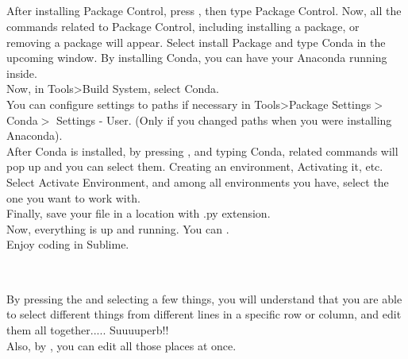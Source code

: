 \documentclass[a4paper,18pt]{article}
\begin{document}

\subsection{\colorbox {matgreen}{\color{white}{\large Conda}}}
After installing Package Control, press {\textbf{\color{Red}{Ctrl+Shift+P}}}, then type Package Control. Now, all the commands related to Package Control, including installing a package, or removing a package will appear. Select install Package and type Conda in the upcoming window. By installing Conda, you can have your Anaconda running inside.\\
Now, in Tools>Build System, select Conda.\\
You can configure settings to paths if necessary in Tools>Package Settings$>$ Conda$>$ Settings - User. (Only if you changed paths when you were installing Anaconda).\\

After Conda is installed, by pressing {\textbf{\color{Red}{Ctrl+Shift+P}}}, and typing Conda, related commands will pop up and you can select them. Creating an environment, Activating it, etc. Select Activate Environment, and among all environments you have, select the one you want to work with.\\
Finally, save your file in a location with .py extension.\\
Now, everything is up and running. You can {\textbf{\color{Red}{compile the code by pressing Ctrl+B}}}.\\
Enjoy coding in Sublime.\\\\



\subsection{\colorbox {matgreen}{\color{white}{\large Some Handy tips and Hotkeys}}}
By pressing the {\textbf{\color{Red}{'Middle-Mouse-Button'}}} and selecting a few things, you will understand that you are able to select different things from different lines in a specific row or column, and edit them all together..... Suuuuperb!!\\

Also, by {\textbf{\color{Red}{holding Ctrl, and click multiple places}}}, you can edit all those places at once.\\
\end{document}
